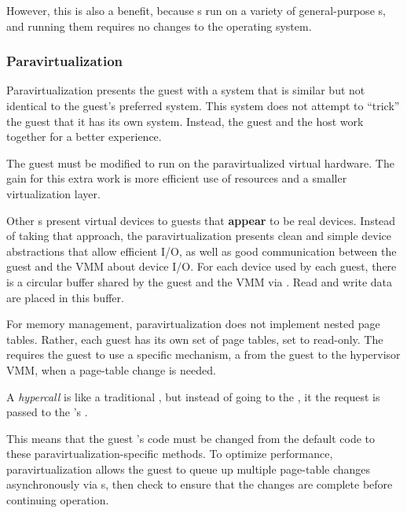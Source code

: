 However, this is also a benefit, because s run on a variety of general-purpose s, and running them requires no changes to the  operating system.

\subsubsection{Paravirtualization}\label{subsubsec:Paravirtualization}
Paravirtualization presents the guest with a system that is similar but not identical to the guest's preferred system.
This system does not attempt to ``trick'' the guest  that it has its own system.
Instead, the guest and the host work together for a better  experience.

The guest must be modified to run on the paravirtualized virtual hardware.
The gain for this extra work is more efficient use of resources and a smaller virtualization layer.

Other s present virtual devices to guests that \textbf{appear} to be real devices.
Instead of taking that approach, the paravirtualization presents clean and simple device abstractions that allow efficient I/O, as well as good communication between the guest and the VMM about device I/O.
For each device used by each guest, there is a circular buffer shared by the guest and the VMM via .
Read and write data are placed in this buffer.

For memory management, paravirtualization does not implement nested page tables.
Rather, each guest has its own set of page tables, set to read-only.
The  requires the guest to use a specific mechanism, a  from the guest to the hypervisor VMM, when a page-table change is needed.

\begin{definition}[Hypercall]\label{def:Hypercall}
  A \emph{hypercall} is like a traditional , but instead of going to the , it the request is passed to the 's .
\end{definition}

This means that the guest 's  code must be changed from the default code to these paravirtualization-specific methods.
To optimize performance, paravirtualization allows the guest to queue up multiple page-table changes asynchronously via s, then check to ensure that the changes are complete before continuing operation.


